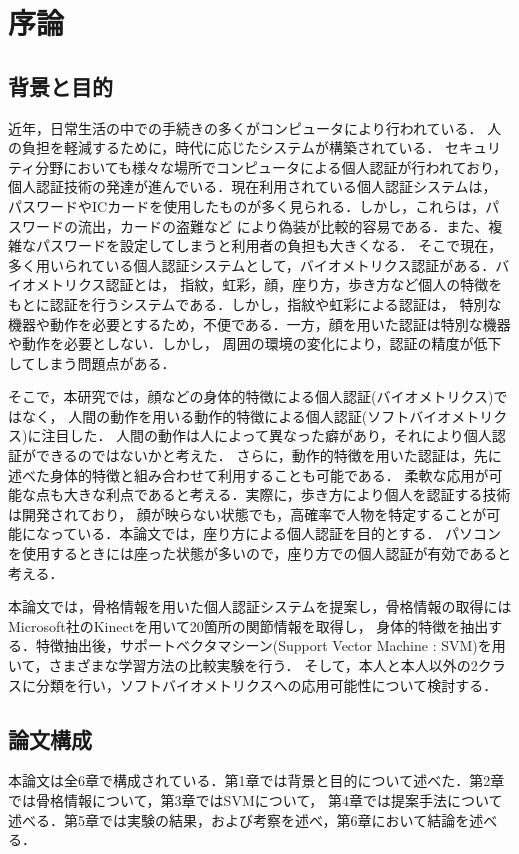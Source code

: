 \chapter{序論}\label{abst}
\section{背景と目的}
近年，日常生活の中での手続きの多くがコンピュータにより行われている．
人の負担を軽減するために，時代に応じたシステムが構築されている．
セキュリティ分野においても様々な場所でコンピュータによる個人認証が行われており，
個人認証技術の発達が進んでいる．現在利用されている個人認証システムは，
パスワードやICカードを使用したものが多く見られる．しかし，これらは，パスワードの流出，カードの盗難など
により偽装が比較的容易である．また、複雑なパスワードを設定してしまうと利用者の負担も大きくなる．
そこで現在，多く用いられている個人認証システムとして，バイオメトリクス認証がある．バイオメトリクス認証とは，
指紋，虹彩，顔，座り方，歩き方など個人の特徴をもとに認証を行うシステムである．しかし，指紋や虹彩による認証は，
特別な機器や動作を必要とするため，不便である．一方，顔を用いた認証は特別な機器や動作を必要としない．しかし，
周囲の環境の変化により，認証の精度が低下してしまう問題点がある．

そこで，本研究では，顔などの身体的特徴による個人認証(バイオメトリクス)ではなく，
人間の動作を用いる動作的特徴による個人認証(ソフトバイオメトリクス)に注目した．
人間の動作は人によって異なった癖があり，それにより個人認証ができるのではないかと考えた．
さらに，動作的特徴を用いた認証は，先に述べた身体的特徴と組み合わせて利用することも可能である．
柔軟な応用が可能な点も大きな利点であると考える．実際に，歩き方により個人を認証する技術\cite{rgb_camera}は開発されており，
顔が映らない状態でも，高確率で人物を特定することが可能になっている．本論文では，座り方による個人認証を目的とする．
パソコンを使用するときには座った状態が多いので，座り方での個人認証が有効であると考える．

本論文では，骨格情報を用いた個人認証システムを提案し，骨格情報の取得にはMicrosoft社のKinectを用いて20箇所の関節情報を取得し，
身体的特徴を抽出する．特徴抽出後，サポートベクタマシーン(Support Vector Machine : SVM)を用いて，さまざまな学習方法の比較実験を行う．
そして，本人と本人以外の2クラスに分類を行い，ソフトバイオメトリクスへの応用可能性について検討する．


\section{論文構成}
本論文は全6章で構成されている．第1章では背景と目的について述べた．第2章では骨格情報について，第3章ではSVMについて，
第4章では提案手法について述べる．第5章では実験の結果，および考察を述べ，第6章において結論を述べる．
